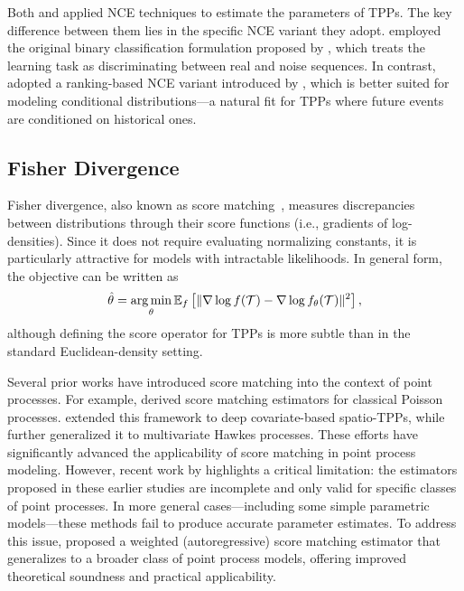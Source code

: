 \documentclass[10pt]{article} %
\begin{document}
Both \citet{guo2018initiator} and \citet{mei2020noise} applied NCE techniques to estimate the parameters of TPPs. The key difference between them lies in the specific NCE variant they adopt. \citet{guo2018initiator} employed the original binary classification formulation proposed by \citet{gutmann2012noise}, which treats the learning task as discriminating between real and noise sequences. In contrast, \citet{mei2020noise} adopted a ranking-based NCE variant introduced by \citet{jozefowicz2016exploring}, which is better suited for modeling conditional distributions—a natural fit for TPPs where future events are conditioned on historical ones. 


\subsection{Fisher Divergence}
\label{fisher_divergence}
Fisher divergence, also known as score matching~\citep{Hyvarinen05}, measures discrepancies between distributions through their score functions (i.e., gradients of log-densities). Since it does not require evaluating normalizing constants, it is particularly attractive for models with intractable likelihoods. In general form, the objective can be written as
\begin{equation}
\hat{\theta} = \operatorname*{arg\,min}_\theta \mathbb{E}_{f}\left[\|\nabla \log f(\mathcal{T})-\nabla \log f_\theta(\mathcal{T})\|^2\right],
\end{equation}
although defining the score operator for TPPs is more subtle than in the standard Euclidean-density setting. 


Several prior works have introduced score matching into the context of point processes. For example, \citet{SahaniBM16} derived score matching estimators for classical Poisson processes. \citet{zhang2023integration} extended this framework to deep covariate-based spatio-TPPs, while \citet{li2023smurf} further generalized it to multivariate Hawkes processes. These efforts have significantly advanced the applicability of score matching in point process modeling.
However, recent work by \citet{caoscore,cao2025score} highlights a critical limitation: the estimators proposed in these earlier studies are incomplete and only valid for specific classes of point processes. In more general cases—including some simple parametric models—these methods fail to produce accurate parameter estimates. To address this issue, \citet{caoscore,cao2025score} proposed a weighted (autoregressive) score matching estimator that generalizes to a broader class of point process models, offering improved theoretical soundness and practical applicability.
\end{document}
